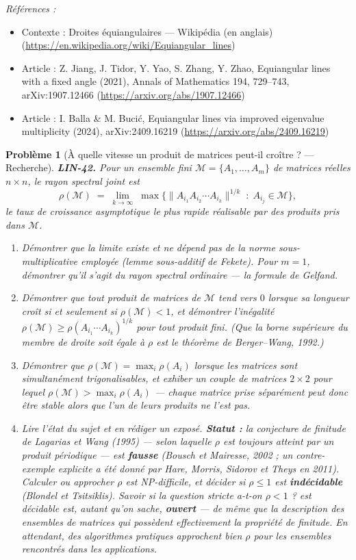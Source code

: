 \documentclass[11pt]{article}
\newtheorem{problem}{Problème}
\newenvironment{refs}{\par\small\noindent\emph{Références :}\begin{itemize}\setlength\itemsep{0pt}}{\end{itemize}\normalsize}
\begin{document}
\begin{refs}
\item Contexte : Droites équiangulaires --- Wikipédia (en anglais) (\url{https://en.wikipedia.org/wiki/Equiangular_lines})
\item Article : Z. Jiang, J. Tidor, Y. Yao, S. Zhang, Y. Zhao, \og{} Equiangular lines with a fixed angle \fg{} (2021), Annals of Mathematics 194, 729--743, arXiv:1907.12466 (\url{https://arxiv.org/abs/1907.12466})
\item Article : I. Balla \& M. Buci\'c, \og{} Equiangular lines via improved eigenvalue multiplicity \fg{} (2024), arXiv:2409.16219 (\url{https://arxiv.org/abs/2409.16219})
\end{refs}

\bigskip

\begin{problem}[{À quelle vitesse un produit de matrices peut-il croître ? --- Recherche}]
\textbf{LIN-42.} Pour un ensemble fini $\mathcal{M} = \{A_1, \dots, A_m\}$ de matrices réelles
$n \times n$, le \textit{rayon spectral joint} est
\[ \rho(\mathcal{M}) \;=\; \lim_{k \to \infty} \; \max \big\{ \|A_{i_1} A_{i_2} \cdots A_{i_k}\|^{1/k} \;:\; A_{i_j} \in \mathcal{M} \big\}, \]
le taux de croissance asymptotique le plus rapide réalisable par des produits pris dans
$\mathcal{M}$.
\begin{enumerate}
\item[(a)] Démontrer que la limite existe et ne dépend pas de la norme sous-multiplicative employée (lemme
sous-additif de Fekete). Pour $m = 1$, démontrer qu'il s'agit du rayon spectral ordinaire --- la
formule de Gelfand.
\item[(b)] Démontrer que tout produit de matrices de $\mathcal{M}$ tend vers $0$ lorsque sa longueur
croît si et seulement si $\rho(\mathcal{M}) < 1$, et démontrer l'inégalité
$\rho(\mathcal{M}) \ge \rho(A_{i_1} \cdots A_{i_k})^{1/k}$ pour tout produit fini. (Que la borne
supérieure du membre de droite soit égale à $\rho$ est le théorème de Berger--Wang, 1992.)
\item[(c)] Démontrer que $\rho(\mathcal{M}) = \max_i \rho(A_i)$ lorsque les matrices sont simultanément
trigonalisables, et exhiber un couple de matrices $2 \times 2$ pour lequel
$\rho(\mathcal{M}) > \max_i \rho(A_i)$ --- chaque matrice prise séparément peut donc être stable
alors que l'un de leurs produits ne l'est pas.
\item[(d)] Lire l'état du sujet et en rédiger un exposé. \textbf{Statut :} la conjecture de finitude de Lagarias
et Wang (1995) --- selon laquelle $\rho$ est toujours atteint par un produit périodique --- est
\textbf{fausse} (Bousch et Mairesse, 2002 ; un contre-exemple explicite a été donné par Hare, Morris,
Sidorov et Theys en 2011). Calculer ou approcher $\rho$ est NP-difficile, et décider si
$\rho \le 1$ est \textbf{indécidable} (Blondel et Tsitsiklis). Savoir si la question stricte \og{} a-t-on
$\rho < 1$ ? \fg{} est décidable est, autant qu'on sache, \textbf{ouvert} --- de même que la description
des ensembles de matrices qui possèdent effectivement la propriété de finitude. En attendant, des
algorithmes pratiques approchent bien $\rho$ pour les ensembles rencontrés dans les
applications.
\end{enumerate}


\end{problem}
\end{document}
